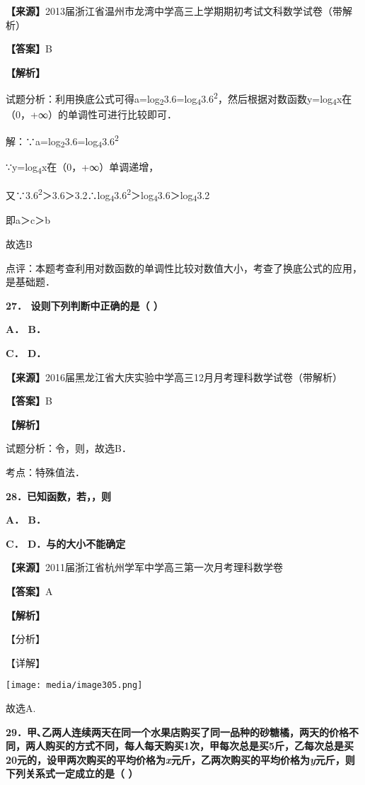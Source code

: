 \textbf{【来源】}2013届浙江省温州市龙湾中学高三上学期期初考试文科数学试卷（带解析）

\textbf{【答案】}B

\textbf{【解析】}

试题分析：利用换底公式可得a=log\textsubscript{2}3.6=log\textsubscript{4}3.6\textsuperscript{2}，然后根据对数函数y=log\textsubscript{4}x在（0，+∞）的单调性可进行比较即可．

解：∵a=log\textsubscript{2}3.6=log\textsubscript{4}3.6\textsuperscript{2}

∵y=log\textsubscript{4}x在（0，+∞）单调递增，

又∵3.6\textsuperscript{2}＞3.6＞3.2∴log\textsubscript{4}3.6\textsuperscript{2}＞log\textsubscript{4}3.6＞log\textsubscript{4}3.2

即a＞c＞b

故选B

点评：本题考查利用对数函数的单调性比较对数值大小，考查了换底公式的应用，是基础题．

\textbf{27． 设则下列判断中正确的是（ ）}

\textbf{A． B．}

\textbf{C． D．}

\textbf{【来源】}2016届黑龙江省大庆实验中学高三12月月考理科数学试卷（带解析）

\textbf{【答案】}B

\textbf{【解析】}

试题分析：令，则，故选B．

考点：特殊值法．

\textbf{28．已知函数，若，，则}

\textbf{A． B．}

\textbf{C． D．与的大小不能确定}

\textbf{【来源】}2011届浙江省杭州学军中学高三第一次月考理科数学卷

\textbf{【答案】}A

\textbf{【解析】}

【分析】

【详解】

\texttt{[image: media/image305.png]}

故选A.

\textbf{29．甲､乙两人连续两天在同一个水果店购买了同一品种的砂糖橘，两天的价格不同，两人购买的方式不同，每人每天购买1次，甲每次总是买5斤，乙每次总是买20元的，设甲两次购买的平均价格为\emph{x}元斤，乙两次购买的平均价格为\emph{y}元斤，则下列关系式一定成立的是（
）}

